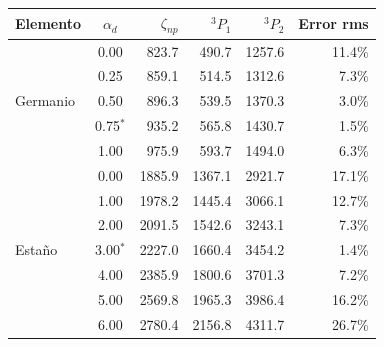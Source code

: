 \begin{tabular}{lcrrrr}
    \toprule
    \textbf{Elemento} & $\alpha_d$ & $\zeta_{np}$ & $^3P_1$ & $^3P_2$ & Error rms \\
    \midrule
    \multirow{5}{*}{Germanio}
     & 0.00 & 823.7 & 490.7 & 1257.6 & 11.4\% \\
     & 0.25 & 859.1 & 514.5 & 1312.6 & 7.3\% \\
     & 0.50 & 896.3 & 539.5 & 1370.3 & 3.0\% \\
     & 0.75$^{*}$ & 935.2 & 565.8 & 1430.7 & 1.5\% \\
     & 1.00 & 975.9 & 593.7 & 1494.0 & 6.3\% \\
    \midrule
    \multirow{7}{*}{Estaño}
     & 0.00 & 1885.9 & 1367.1 & 2921.7 & 17.1\% \\
     & 1.00 & 1978.2 & 1445.4 & 3066.1 & 12.7\% \\
     & 2.00 & 2091.5 & 1542.6 & 3243.1 & 7.3\% \\
     & 3.00$^{*}$ & 2227.0 & 1660.4 & 3454.2 & 1.4\% \\
     & 4.00 & 2385.9 & 1800.6 & 3701.3 & 7.2\% \\
     & 5.00 & 2569.8 & 1965.3 & 3986.4 & 16.2\% \\
     & 6.00 & 2780.4 & 2156.8 & 4311.7 & 26.7\% \\
    \bottomrule
\end{tabular}
